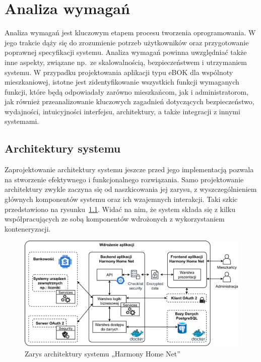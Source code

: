 \chapter{Analiza wymagań}
Analiza wymagań jest kluczowym etapem procesu tworzenia oprogramowania. W jego trakcie dąży się do zrozumienie potrzeb użytkowników oraz przygotowanie poprawnej specyfikacji systemu. Analiza wymagań powinna uwzględniać także inne aspekty, związane np.\ ze skalowalnością, bezpieczeństwem i utrzymaniem systemu. W przypadku projektowania aplikacji typu eBOK dla wspólnoty mieszkaniowej, istotne jest zidentyfikowanie wszystkich funkcji wymaganych funkcji, które będą odpowiadały zarówno mieszkańcom, jak i administratorom, jak również przeanalizowanie kluczowych zagadnień dotyczących bezpieczeństwo, wydajności, intuicyjności interfejsu, architektury, a także integracji z innymi systemami. 

\section{Architektury systemu}
Zaprojektowanie architektury systemu jeszcze przed jego implementacją pozwala na stworzenie efektywnego i funkcjonalnego rozwiązania. Samo projektowanie architektury zwykle zaczyna się od naszkicowania jej zarysu, z wyszczególnieniem głównych komponentów systemu oraz ich wzajemnych interakcji. Taki szkic przedstawiono na rysunku~\ref{fig:zarys_architektury}. Widać na nim, że system składa się z kilku współpracujących ze sobą komponentów wdrożonych z wykorzystaniem konteneryzacji.
\begin{figure}[ht]
    \centering
    \includegraphics[width=\linewidth]{Schematy/zarys_architektury}
    \caption{Zarys architektury systemu „Harmony Home Net”}
    \label{fig:zarys_architektury}
\end{figure}


